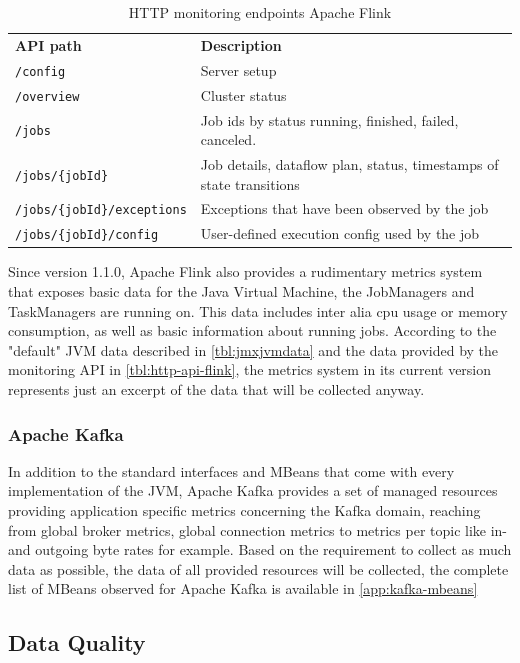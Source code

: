 \begin{table}[H]
    \begin{tabular}{ll}
        \textbf{API path} & \textbf{Description} \\
        \verb|/config| & Server setup \\
        \verb|/overview| & Cluster status \\
        \verb|/jobs| & Job ids by status running, finished, failed, canceled. \\
        \verb|/jobs/{jobId}| & Job details, dataflow plan, status, timestamps of state transitions \\
        \verb|/jobs/{jobId}/exceptions| &  Exceptions that have been observed by the job \\
        \verb|/jobs/{jobId}/config| & User-defined execution config used by the job \\
    \end{tabular}
    \caption{HTTP monitoring endpoints Apache Flink}
    \label{tbl:http-api-flink}
\end{table}

Since version 1.1.0, Apache Flink also provides a rudimentary metrics system that exposes
basic data for the Java Virtual Machine, the JobManagers and TaskManagers are running
on. This data includes inter alia cpu usage or memory consumption, as well as basic
information about running jobs. According to the "default" JVM data described in \autoref{tbl:jmxjvmdata}
and the data provided by the monitoring API in \autoref{tbl:http-api-flink}, the metrics system in its current version
represents just an excerpt of the data that will be collected anyway.

\subsubsection{Apache Kafka}

In addition to the standard interfaces and MBeans that come with every implementation
of the JVM, Apache Kafka provides a set of managed resources providing application
specific metrics concerning the Kafka domain, reaching from global broker metrics, global
connection metrics to metrics per topic like in- and outgoing byte rates for example. Based
on the requirement to collect as much data as possible, the data of all provided resources
will be collected, the complete list of MBeans observed for Apache Kafka is available in
\autoref{app:kafka-mbeans}

\subsection{Data Quality}

